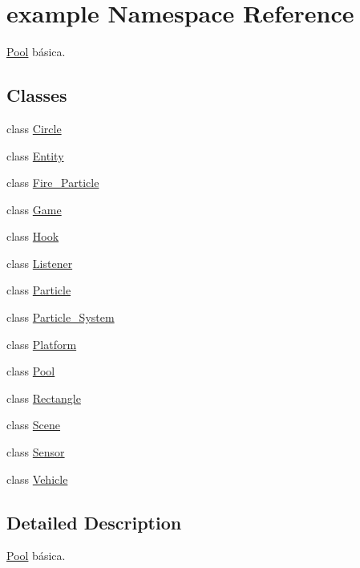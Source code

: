 \hypertarget{namespaceexample}{}\section{example Namespace Reference}
\label{namespaceexample}


\mbox{\hyperlink{classexample_1_1_pool}{Pool}} básica.  


\subsection*{Classes}
\begin{DoxyCompactItemize}
\item 
class \mbox{\hyperlink{classexample_1_1_circle}{Circle}}
\item 
class \mbox{\hyperlink{classexample_1_1_entity}{Entity}}
\item 
class \mbox{\hyperlink{classexample_1_1_fire___particle}{Fire\+\_\+\+Particle}}
\item 
class \mbox{\hyperlink{classexample_1_1_game}{Game}}
\item 
class \mbox{\hyperlink{classexample_1_1_hook}{Hook}}
\item 
class \mbox{\hyperlink{classexample_1_1_listener}{Listener}}
\item 
class \mbox{\hyperlink{classexample_1_1_particle}{Particle}}
\item 
class \mbox{\hyperlink{classexample_1_1_particle___system}{Particle\+\_\+\+System}}
\item 
class \mbox{\hyperlink{classexample_1_1_platform}{Platform}}
\item 
class \mbox{\hyperlink{classexample_1_1_pool}{Pool}}
\item 
class \mbox{\hyperlink{classexample_1_1_rectangle}{Rectangle}}
\item 
class \mbox{\hyperlink{classexample_1_1_scene}{Scene}}
\item 
class \mbox{\hyperlink{classexample_1_1_sensor}{Sensor}}
\item 
class \mbox{\hyperlink{classexample_1_1_vehicle}{Vehicle}}
\end{DoxyCompactItemize}


\subsection{Detailed Description}
\mbox{\hyperlink{classexample_1_1_pool}{Pool}} básica. 

